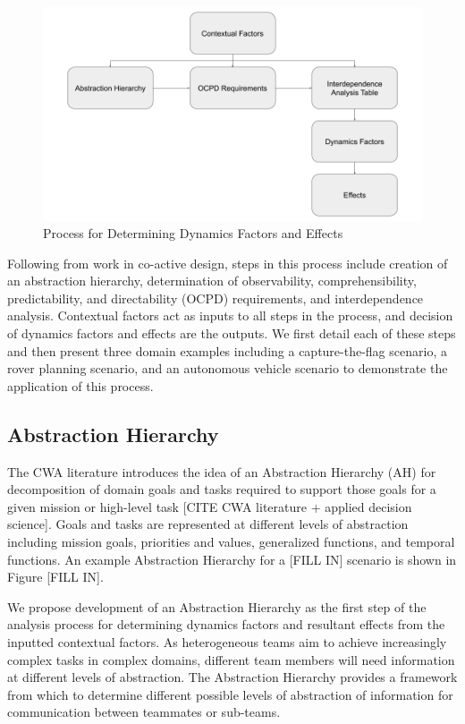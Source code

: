 \documentclass[letterpaper, 10 pt, conference]{ieeeconf}  %
\theoremstyle{definition}
\begin{document}
    \begin{figure}[tb]
    \centering
    \includegraphics[width=\columnwidth]{TaxonomyDesign.png}
   \caption{Process for Determining Dynamics Factors and Effects}
    \label{fig:tax_design}
    \end{figure}

Following from work in co-active design, steps in this process include creation of an abstraction hierarchy, determination of observability, comprehensibility, predictability, and directability (OCPD) requirements, and interdependence analysis. Contextual factors act as inputs to all steps in the process, and decision of dynamics factors and effects are the outputs. We first detail each of these steps and then present three domain examples including a capture-the-flag scenario, a rover planning scenario, and an autonomous vehicle scenario to demonstrate the application of this process.

\subsection{Abstraction Hierarchy}
The CWA literature introduces the idea of an Abstraction Hierarchy (AH) for decomposition of domain goals and tasks required to support those goals for a given mission or high-level task [CITE CWA literature + applied decision science]. Goals and tasks are represented at different levels of abstraction including mission goals, priorities and values, generalized functions, and temporal functions. An example Abstraction Hierarchy for a [FILL IN] scenario is shown in Figure [FILL IN]. 

We propose development of an Abstraction Hierarchy as the first step of the analysis process for determining dynamics factors and resultant effects from the inputted contextual factors. As heterogeneous teams aim to achieve increasingly complex tasks in complex domains, different team members will need information at different levels of abstraction. The Abstraction Hierarchy provides a framework from which to determine different possible levels of abstraction of information for communication between teammates or sub-teams. 
\end{document}
